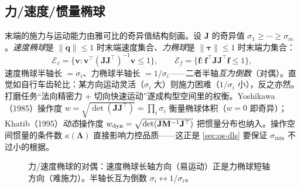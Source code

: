 \subsection{力/速度/惯量椭球}
\label{sec:os-ellipsoid}

末端的施力与运动能力由雅可比的奇异值结构刻画。设 $\mathbf J$ 的奇异值 $\sigma_1\ge\cdots\ge\sigma_m$。\emph{速度椭球}是 $\|\dot{\mathbf q}\|\le1$ 时末端速度集合、\emph{力椭球}是 $\|\boldsymbol\tau\|\le1$ 时末端力集合：
\begin{equation}
  \mathcal E_v=\{\mathbf v:\mathbf v^\top(\mathbf J\mathbf J^\top)^{-1}\mathbf v\le1\},\qquad
  \mathcal E_f=\{\mathbf f:\mathbf f^\top\mathbf J\mathbf J^\top\mathbf f\le1\},
  \label{eq:os-ellipsoid}
\end{equation}
速度椭球半轴长 $=\sigma_i$、力椭球半轴长 $=1/\sigma_i$——二者半轴\emph{互为倒数}（对偶）。直觉如自行车齿轮比：某方向运动灵活（$\sigma_i$ 大）则施力困难（$1/\sigma_i$ 小），反之亦然。打磨任务“法向精密力 + 切向快速运动”遂成构型空间里的权衡。Yoshikawa（1985）操作度 $w=\sqrt{\det(\mathbf J\mathbf J^\top)}=\prod_i\sigma_i$ 衡量椭球体积（$w=0$ 即奇异）\cite{yoshikawa1985manipulability}；Khatib（1995）\emph{动态}操作度 $w_{\rm dyn}=\sqrt{\det(\mathbf J\mathbf M^{-1}\mathbf J^\top)}$ 把惯量分布也纳入\cite{khatib1995inertial}。操作空间惯量的条件数 $\kappa(\boldsymbol\Lambda)$ 直接影响力控品质——这正是 \cref{sec:os-dls} 要保证 $\sigma_{\min}$ 不过小的根据。

\begin{figure}[ht]
\centering
{}
\caption{力/速度椭球的对偶：速度椭球长轴方向（易运动）正是力椭球短轴方向（难施力）。半轴长互为倒数 $\sigma_i\leftrightarrow1/\sigma_i$。}
\label{fig:os-ellipsoid}
\end{figure}

